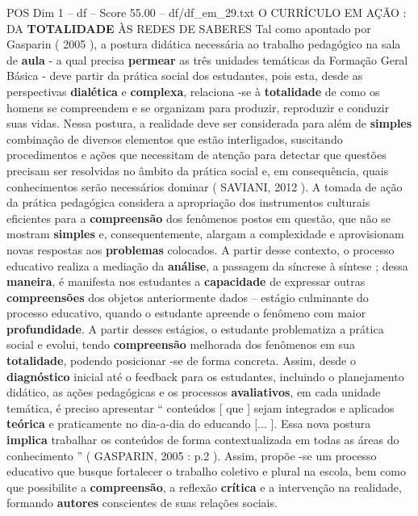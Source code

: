 \begin{textsample}{POS Dim 1 – df – Score 55.00 – df/df\_em\_29.txt}  \label{ex:f1_pos_121}
O CURRÍCULO EM AÇÃO : DA \textbf{TOTALIDADE} ÀS REDES DE SABERES Tal como apontado por Gasparin ( 2005 ), a postura didática necessária ao trabalho pedagógico na sala de \textbf{aula} - a qual precisa \textbf{permear} as três unidades temáticas da Formação Geral Básica - deve partir da prática social dos estudantes, pois esta, desde as perspectivas \textbf{dialética} e \textbf{complexa}, relaciona -se à \textbf{totalidade} de como os homens se compreendem e se organizam para produzir, reproduzir e conduzir suas vidas.
Nessa postura, a realidade deve ser considerada para além de \textbf{simples} combinação de diversos elementos que estão interligados, suscitando procedimentos e ações que necessitam de atenção para detectar que questões precisam ser resolvidas no âmbito da prática social e, em consequência, quais conhecimentos serão necessários dominar ( SAVIANI, 2012 ).
A tomada de ação da prática pedagógica considera a apropriação dos instrumentos culturais eficientes para a \textbf{compreensão} dos fenômenos postos em questão, que não se mostram \textbf{simples} e, consequentemente, alargam a complexidade e aprovisionam novas respostas aos \textbf{problemas} colocados.
A partir desse contexto, o processo educativo realiza a mediação da \textbf{análise}, a passagem da síncrese à síntese ; dessa \textbf{maneira}, é manifesta nos estudantes a \textbf{capacidade} de expressar outras \textbf{compreensões} dos objetos anteriormente dados – estágio culminante do processo educativo, quando o estudante apreende o fenômeno com maior \textbf{profundidade}.
A partir desses estágios, o estudante problematiza a prática social e evolui, tendo \textbf{compreensão} melhorada dos fenômenos em sua \textbf{totalidade}, podendo posicionar -se de forma concreta.
Assim, desde o \textbf{diagnóstico} inicial até o feedback para os estudantes, incluindo o planejamento didático, as ações pedagógicas e os processos \textbf{avaliativos}, em cada unidade temática, é preciso apresentar “ conteúdos [ que ] sejam integrados e aplicados \textbf{teórica} e praticamente no dia-a-dia do educando [... ].
Essa nova postura \textbf{implica} trabalhar os conteúdos de forma contextualizada em todas as áreas do conhecimento ” ( GASPARIN, 2005 : p.2 ).
Assim, propõe -se um processo educativo que busque fortalecer o trabalho coletivo e plural na escola, bem como que possibilite a \textbf{compreensão}, a reflexão \textbf{crítica} e a intervenção na realidade, formando \textbf{autores} conscientes de suas relações sociais.

\end{textsample}
